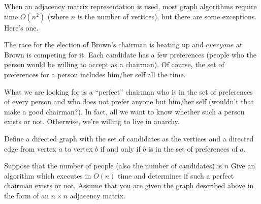 When an adjacency matrix representation is used, most graph algorithms
require time $O(n^2)$ (where $n$ is the number of vertices), but there
are some exceptions. Here's one.

The race for the election of Brown's chairman is heating up and
$everyone$ at Brown is competing for it. Each candidate has a few
preferences (people who the person would be willing to accept as a
chairman). Of course, the set of preferences for a person includes
him/her self all the time.

What we are looking for is a ``perfect'' chairman who is in the set of
preferences of every person and who does not prefer anyone but him/her
self (wouldn't that make a good chairman?). In fact, all we want to
know whether such a person exists or not. Otherwise, we're willing to
live in anarchy.

Define a directed graph with the set of candidates as the vertices and
a directed edge from vertex $a$ to vertex $b$ if and only if $b$ is in
the set of preferences of $a$. 

Suppose that the number of people (also the number of candidates) is
$n$ Give an algorithm which executes in $O(n)$ time and determines if
such a perfect chairman exists or not. Assume that you are given the
graph described above in the form of an $n \times  n$ adjacency matrix.

